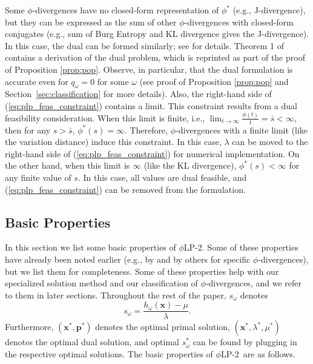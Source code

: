 \documentclass[opre,nonblindrev]{informs3} %
\newcommand{\x}{\mathbf{x}}
\newcommand{\p}{\mathbf{p}}
\newcommand{\plp}{$\phi$LP-2}
\begin{document}
Some $\phi$-divergences have no closed-form representation of $\phi^*$ (e.g., J-divergence), but they can be expressed as the sum of other $\phi$-divergences with closed-form conjugates (e.g., sum of Burg Entropy and KL divergence gives the J-divergence). 
In this case, the dual can be formed similarly; see \cite{bental2011robust} for details.
Theorem 1 of \cite{bental2011robust} contains a derivation of the dual problem, which is reprinted as part of the proof of Proposition \ref{prop:pop}.
Observe, in particular, that the dual formulation is accurate even for $q_\omega = 0$ for some $\omega$ (see proof of  Proposition \ref{prop:pop} and  Section~\ref{sec:classification} for more details).
Also, the right-hand side of (\ref{eq:plp_feas_constraint}) contains a limit.
This constraint results from a dual feasibility consideration. 
When this limit is finite, i.e., $\lim_{t \rightarrow \infty} \frac{\phi(t)}{t}=  \bar{s}<\infty$, then for any $s> \bar{s}$, $\phi^*(s)=\infty$. 
Therefore, $\phi$-divergences with a finite limit (like the variation distance) induce this constraint.
In this case, $\lambda$ can be moved to the right-hand side of (\ref{eq:plp_feas_constraint}) for numerical implementation. 
On the other hand, when this limit is $\infty$ (like the KL divergence), $\phi^*(s)<\infty$ for any finite value of $s$. 
In this case, all values are dual feasible, and (\ref{eq:plp_feas_constraint}) can be removed from the formulation. 



\subsection{Basic Properties}
\label{ssec:basicprop}

In this section we list some basic properties of \plp.
Some of these properties have already been noted earlier (e.g., by \citet{bental2011robust} and by others for specific $\phi$-divergences), but we list them for completeness.
Some of these properties help with our specialized solution method and our classification of $\phi$-divergences, and we refer to them in later sections.
Throughout the rest of the paper, $s_\omega$ denotes
\begin{equation*}
	s_\omega = \frac{h_\omega(\x) - \mu}{\lambda}. %
\end{equation*}
Furthermore, $(\x^*, \p^*)$ denotes the optimal primal solution, $(\x^*, \lambda^*, \mu^*)$ denotes the optimal dual solution, and optimal $s_\omega^*$ can be found by plugging in the respective optimal solutions. 
The basic properties of \plp\ are as follows.
\end{document}
